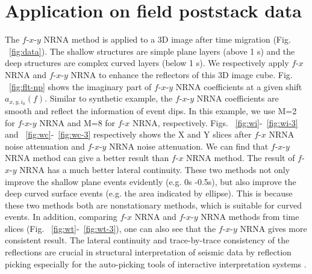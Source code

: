 \section{Application on field poststack data}







The $f$-$x$-$y$ NRNA method is applied to a 3D image after time migration (Fig. ~\ref{fig:data}). 
The shallow structures are simple plane layers (above 1 s) and the deep structures 
are complex curved layers (below 1 s). We respectively apply $f$-$x$ NRNA and $f$-$x$-$y$ 
NRNA to enhance the reflectors of this 3D image cube. Fig. ~\ref{fig:flt-np} shows the imaginary 
part of $f$-$x$-$y$ NRNA coefficients at a given shift ${{a}_{x,y,{{i}_{0}}}}(f)$. 
Similar to synthetic example, the $f$-$x$-$y$ NRNA coefficients are smooth and reflect 
the information of event dips. In this example, we use M=2 for $f$-$x$-$y$ NRNA and 
M=8 for $f$-$x$ NRNA, respectively. Figs. ~\ref{fig:wi}-~\ref{fig:wi-3} and ~\ref{fig:wc}-~\ref{fig:wc-3} respectively shows the X and Y 
slices after $f$-$x$ NRNA noise attenuation and $f$-$x$-$y$ NRNA noise attenuation. We 
can find that $f$-$x$-$y$ NRNA method can give a better result than $f$-$x$ NRNA method. 
The result of $f$-$x$-$y$ NRNA has a much better lateral continuity. These two methods 
not only improve the shallow plane events evidently (e.g. 0s -0.5s), but also 
improve the deep curved surface events (e.g. the area indicated by ellipse). 
This is because these two methods both are nonstationary methods, which is 
suitable for curved events. In addition, comparing $f$-$x$ NRNA and $f$-$x$-$y$ NRNA 
methods from time slices (Fig. ~\ref{fig:wt}-~\ref{fig:wt-3}), one can also see that the $f$-$x$-$y$ NRNA 
gives more consistent result. The lateral continuity and trace-by-trace 
consistency of the reflections are crucial in structural interpretation 
of seismic data by reflection picking especially for the auto-picking 
tools of interactive interpretation systems \cite[]{Fomel2010}.

